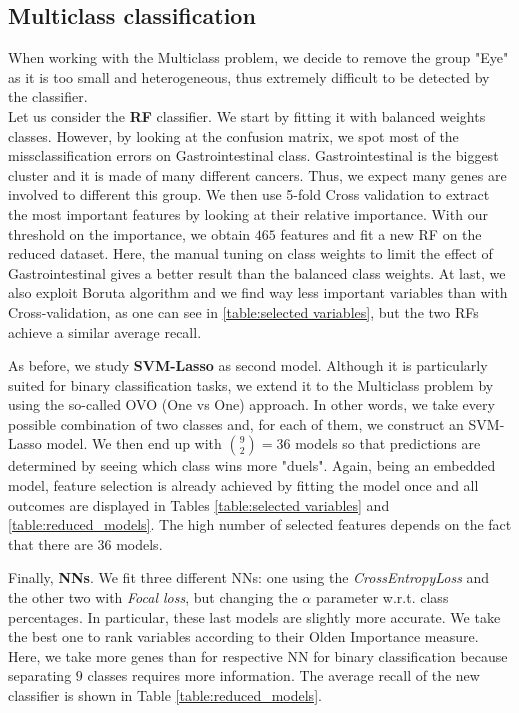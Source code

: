 \documentclass[a4paper,11pt, oneside]{article}  %
\begin{document}
\subsection{Multiclass classification}
When working with the Multiclass problem, we decide to remove the group "Eye" as it is too small and heterogeneous,  thus extremely difficult to be detected by the classifier.  \\

Let us consider the \textbf{RF}  classifier. We start by fitting it with balanced weights classes. However, by looking at the confusion matrix, we spot most of the missclassification errors on Gastrointestinal class. Gastrointestinal is the biggest cluster and it is made of many different cancers. Thus, we expect many genes are involved to different this group. We then use 5-fold Cross validation to extract the most important features by looking at their relative importance. With our threshold on the importance, we obtain $465$ features and fit a new RF on the reduced dataset. Here, the manual tuning on class weights to limit the effect of Gastrointestinal gives a better result than the balanced class weights. At last, we also exploit Boruta algorithm and we find way less important variables than with Cross-validation, as one can see in \ref{table:selected variables}, but the two RFs achieve a similar average recall.

As before, we study \textbf{SVM-Lasso} as second model.  Although it is particularly suited for binary classification tasks, we extend it to the Multiclass problem by using the so-called OVO (One vs One) approach. In other words, we take every possible combination of two classes and, for each of them, we construct an SVM-Lasso model. We then end up with $ \binom{9}{2} = 36$ models so that predictions are determined by seeing which class wins more "duels". Again,  being an embedded model, feature selection is already achieved by fitting the model once and all outcomes are displayed in Tables \ref{table:selected variables} and \ref{table:reduced_models}. The high number of selected features depends on the fact that there are 36 models.  

Finally, \textbf{NNs}. We fit three different NNs: one using the \textit{CrossEntropyLoss} and the other two with \textit{Focal loss}, but changing the $\alpha$ parameter w.r.t. class percentages. In particular, these last models are slightly more accurate. We take the best one to rank variables according to their Olden Importance measure. Here, we take more genes than for respective NN for binary classification because separating $9$ classes requires more information. The average recall of the new classifier is shown in Table \ref*{table:reduced_models}.
\end{document}
